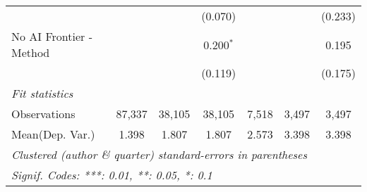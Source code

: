 \begin{tabular}{lcccccc}
                           &               &               & (0.070)       &               &              & (0.233)\\   
   No AI Frontier - Method &               &               & 0.200$^{*}$   &               &              & 0.195\\   
                           &               &               & (0.119)       &               &              & (0.175)\\   
   \midrule
   \emph{Fit statistics}\\
   Observations            & 87,337        & 38,105        & 38,105        & 7,518         & 3,497        & 3,497\\  
Mean(Dep. Var.) & 1.398 & 1.807 & 1.807 & 2.573 & 3.398 & 3.398 \\
   \midrule \midrule
   \multicolumn{7}{l}{\emph{Clustered (author \& quarter) standard-errors in parentheses}}\\
   \multicolumn{7}{l}{\emph{Signif. Codes: ***: 0.01, **: 0.05, *: 0.1}}\\
\end{tabular}
\par\endgroup
